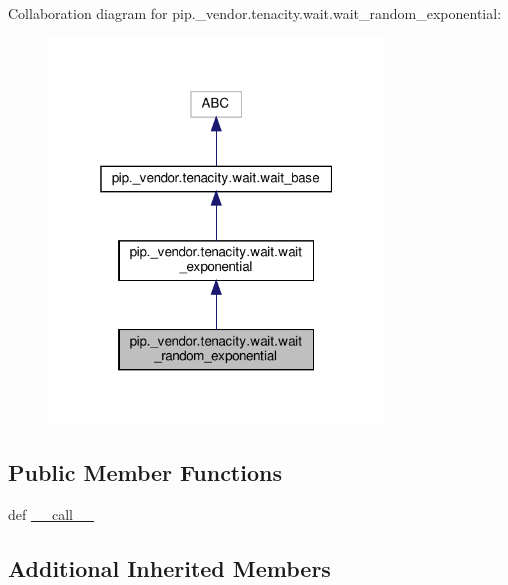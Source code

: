 Collaboration diagram for pip.\+\_\+vendor.\+tenacity.\+wait.\+wait\+\_\+random\+\_\+exponential\+:
\nopagebreak
\begin{figure}[H]
\begin{center}
\leavevmode
\includegraphics[width=253pt]{classpip_1_1__vendor_1_1tenacity_1_1wait_1_1wait__random__exponential__coll__graph}
\end{center}
\end{figure}
\subsection*{Public Member Functions}
\begin{DoxyCompactItemize}
\item 
def \hyperlink{classpip_1_1__vendor_1_1tenacity_1_1wait_1_1wait__random__exponential_ac6a0ed8050e3b4a9617fdbb742641275}{\+\_\+\+\_\+call\+\_\+\+\_\+}
\end{DoxyCompactItemize}
\subsection*{Additional Inherited Members}


